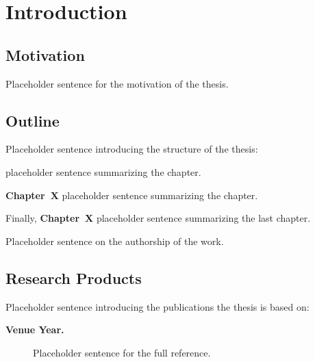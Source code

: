 \chapter{Introduction}
\label{ch1}

\section{Motivation}
\label{ch1:sec:motivation}

Placeholder sentence for the motivation of the thesis.

\section{Outline}
\label{ch1:sec:outline}

Placeholder sentence introducing the structure of the thesis:

\medskip

\noindent\textbf{} placeholder sentence
summarizing the chapter.

\medskip

\noindent\textbf{Chapter~X} placeholder sentence
summarizing the chapter.

\medskip

\noindent Finally, \textbf{Chapter~X} placeholder sentence
summarizing the last chapter.

\bigskip

Placeholder sentence on the authorship of the work.

\section{Research Products}
\label{ch1:sec:research-products}

Placeholder sentence introducing the publications the thesis is based on:

\begin{description}
  \item[\bfseries Venue Year.] Placeholder sentence for the full reference.
\end{description}
